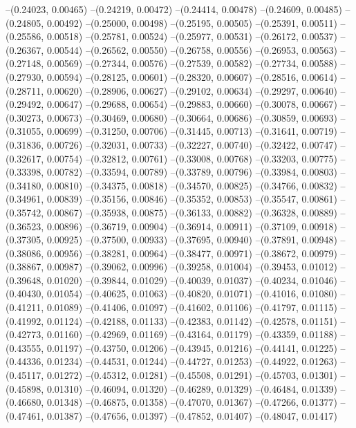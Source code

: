 --(0.24023, 0.00465)
--(0.24219, 0.00472)
--(0.24414, 0.00478)
--(0.24609, 0.00485)
--(0.24805, 0.00492)
--(0.25000, 0.00498)
--(0.25195, 0.00505)
--(0.25391, 0.00511)
--(0.25586, 0.00518)
--(0.25781, 0.00524)
--(0.25977, 0.00531)
--(0.26172, 0.00537)
--(0.26367, 0.00544)
--(0.26562, 0.00550)
--(0.26758, 0.00556)
--(0.26953, 0.00563)
--(0.27148, 0.00569)
--(0.27344, 0.00576)
--(0.27539, 0.00582)
--(0.27734, 0.00588)
--(0.27930, 0.00594)
--(0.28125, 0.00601)
--(0.28320, 0.00607)
--(0.28516, 0.00614)
--(0.28711, 0.00620)
--(0.28906, 0.00627)
--(0.29102, 0.00634)
--(0.29297, 0.00640)
--(0.29492, 0.00647)
--(0.29688, 0.00654)
--(0.29883, 0.00660)
--(0.30078, 0.00667)
--(0.30273, 0.00673)
--(0.30469, 0.00680)
--(0.30664, 0.00686)
--(0.30859, 0.00693)
--(0.31055, 0.00699)
--(0.31250, 0.00706)
--(0.31445, 0.00713)
--(0.31641, 0.00719)
--(0.31836, 0.00726)
--(0.32031, 0.00733)
--(0.32227, 0.00740)
--(0.32422, 0.00747)
--(0.32617, 0.00754)
--(0.32812, 0.00761)
--(0.33008, 0.00768)
--(0.33203, 0.00775)
--(0.33398, 0.00782)
--(0.33594, 0.00789)
--(0.33789, 0.00796)
--(0.33984, 0.00803)
--(0.34180, 0.00810)
--(0.34375, 0.00818)
--(0.34570, 0.00825)
--(0.34766, 0.00832)
--(0.34961, 0.00839)
--(0.35156, 0.00846)
--(0.35352, 0.00853)
--(0.35547, 0.00861)
--(0.35742, 0.00867)
--(0.35938, 0.00875)
--(0.36133, 0.00882)
--(0.36328, 0.00889)
--(0.36523, 0.00896)
--(0.36719, 0.00904)
--(0.36914, 0.00911)
--(0.37109, 0.00918)
--(0.37305, 0.00925)
--(0.37500, 0.00933)
--(0.37695, 0.00940)
--(0.37891, 0.00948)
--(0.38086, 0.00956)
--(0.38281, 0.00964)
--(0.38477, 0.00971)
--(0.38672, 0.00979)
--(0.38867, 0.00987)
--(0.39062, 0.00996)
--(0.39258, 0.01004)
--(0.39453, 0.01012)
--(0.39648, 0.01020)
--(0.39844, 0.01029)
--(0.40039, 0.01037)
--(0.40234, 0.01046)
--(0.40430, 0.01054)
--(0.40625, 0.01063)
--(0.40820, 0.01071)
--(0.41016, 0.01080)
--(0.41211, 0.01089)
--(0.41406, 0.01097)
--(0.41602, 0.01106)
--(0.41797, 0.01115)
--(0.41992, 0.01124)
--(0.42188, 0.01133)
--(0.42383, 0.01142)
--(0.42578, 0.01151)
--(0.42773, 0.01160)
--(0.42969, 0.01169)
--(0.43164, 0.01179)
--(0.43359, 0.01188)
--(0.43555, 0.01197)
--(0.43750, 0.01206)
--(0.43945, 0.01216)
--(0.44141, 0.01225)
--(0.44336, 0.01234)
--(0.44531, 0.01244)
--(0.44727, 0.01253)
--(0.44922, 0.01263)
--(0.45117, 0.01272)
--(0.45312, 0.01281)
--(0.45508, 0.01291)
--(0.45703, 0.01301)
--(0.45898, 0.01310)
--(0.46094, 0.01320)
--(0.46289, 0.01329)
--(0.46484, 0.01339)
--(0.46680, 0.01348)
--(0.46875, 0.01358)
--(0.47070, 0.01367)
--(0.47266, 0.01377)
--(0.47461, 0.01387)
--(0.47656, 0.01397)
--(0.47852, 0.01407)
--(0.48047, 0.01417)

